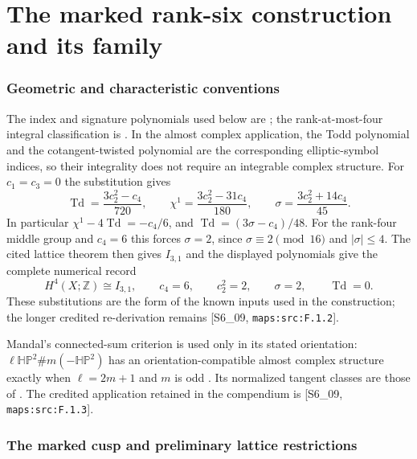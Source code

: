 \clearpage
\part{The marked rank-six construction and its family}
\section{Geometric and characteristic conventions}\label{sec:V-known-inputs}
The index and signature polynomials used below are
\cite[equations (1.2)--(1.4), pp.~3--4]{ffEsoleKang}; the
rank-at-most-four integral classification is
\cite[Theorem 2.2.1, p.~61]{ffPetersSterk}.  In the almost
complex application, the Todd polynomial and the cotangent-twisted
polynomial are the corresponding elliptic-symbol indices, so their
integrality does not require an integrable complex structure.
For $c_1=c_3=0$ the substitution gives
\begin{equation}
\operatorname{Td}=\frac{3c_2^2-c_4}{720},\qquad
\chi^1=\frac{3c_2^2-31c_4}{180},\qquad
\sigma=\frac{3c_2^2+14c_4}{45}.
\label{maps:eq:F.1}
\end{equation}
In particular $\chi^1-4\operatorname{Td}=-c_4/6$, and
$\operatorname{Td}=(3\sigma-c_4)/48$.  For the rank-four middle
group and $c_4=6$ this forces $\sigma=2$, since
$\sigma\equiv2\pmod {16}$ and $|\sigma|\leq4$.
The cited lattice theorem then gives $I_{3,1}$ and the displayed
polynomials give the complete numerical record
\begin{equation}
 H^4(X;\mathbb Z)\cong I_{3,1},\qquad c_4=6,\qquad
 c_2^2=2,\qquad\sigma=2,\qquad\operatorname{Td}=0.
 \label{maps:eq:F.2}
\end{equation}
These substitutions are the form of the known inputs used in
the construction; the longer credited re-derivation remains
[S6\_09, \nolinkurl{maps:src:F.1.2}].

Mandal's connected-sum criterion is used only in its stated
orientation: $\ell\mathbb{HP}^2\#m(-\mathbb{HP}^2)$ has an
orientation-compatible almost complex structure exactly when
$\ell=2m+1$ and $m$ is odd
\cite[Corollary 1.4, p.~4, and its proof in \S5]{ffMandal}.
Its normalized tangent classes are those of
\cite[Lemma 2.1, p.~5, and Theorem 2.4, p.~7]{ffMandal}.
The credited application retained in the compendium is
[S6\_09, \nolinkurl{maps:src:F.1.3}].


\section{The marked cusp and preliminary lattice restrictions}



